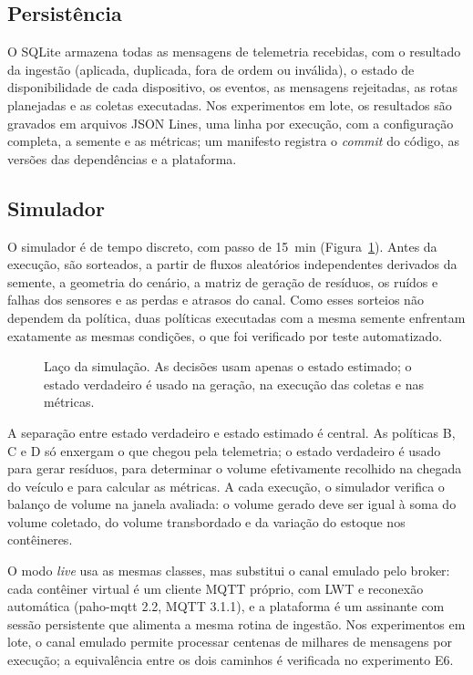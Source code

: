 \subsection{Persistência}

O SQLite armazena todas as mensagens de telemetria recebidas, com o resultado
da ingestão (aplicada, duplicada, fora de ordem ou inválida), o estado de
disponibilidade de cada dispositivo, os eventos, as mensagens rejeitadas, as
rotas planejadas e as coletas executadas. Nos experimentos em lote, os
resultados são gravados em arquivos JSON Lines, uma linha por execução, com a
configuração completa, a semente e as métricas; um manifesto registra o
\emph{commit} do código, as versões das dependências e a plataforma.

\subsection{Simulador}

O simulador é de tempo discreto, com passo de 15~min
(Figura~\ref{fig:simulacao}). Antes da execução, são sorteados, a partir de
fluxos aleatórios independentes derivados da semente, a geometria do cenário,
a matriz de geração de resíduos, os ruídos e falhas dos sensores e as perdas e
atrasos do canal. Como esses sorteios não dependem da política, duas políticas
executadas com a mesma semente enfrentam exatamente as mesmas condições, o que
foi verificado por teste automatizado.

\begin{figure}[ht]
  \centering
  
  \caption{Laço da simulação. As decisões usam apenas o estado estimado; o
  estado verdadeiro é usado na geração, na execução das coletas e nas
  métricas.}
  \label{fig:simulacao}
\end{figure}

A separação entre estado verdadeiro e estado estimado é central. As políticas
B, C e D só enxergam o que chegou pela telemetria; o estado verdadeiro é usado
para gerar resíduos, para determinar o volume efetivamente recolhido na
chegada do veículo e para calcular as métricas. A cada execução, o simulador
verifica o balanço de volume na janela avaliada: o volume gerado deve ser igual
à soma do volume coletado, do volume transbordado e da variação do estoque nos
contêineres.

O modo \emph{live} usa as mesmas classes, mas substitui o canal emulado pelo
broker: cada contêiner virtual é um cliente MQTT próprio, com LWT e
reconexão automática (paho-mqtt 2.2, MQTT 3.1.1), e a plataforma é um
assinante com sessão persistente que alimenta a mesma rotina de ingestão.
Nos experimentos em lote, o canal emulado permite processar centenas de
milhares de mensagens por execução; a equivalência entre os dois caminhos é
verificada no experimento E6.

